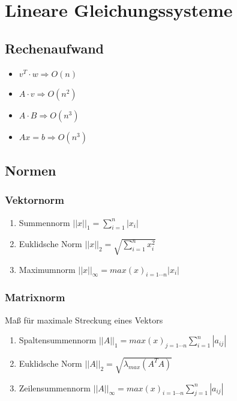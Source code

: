 \section{Lineare Gleichungssysteme}

\subsection{Rechenaufwand}
\begin{itemize}
	\item $v^T \cdot w \Rightarrow O(n)$
	\item $A \cdot v \Rightarrow O(n^2)$
	\item $A \cdot B \Rightarrow O(n^3)$
	\item $Ax = b \Rightarrow O(n^3)$
\end{itemize}

\subsection{Normen}

\subsubsection*{Vektornorm}
\begin{enumerate}

	\item Summennorm $||x||_1 = \sum_{i=1}^n|x_i|$
	
	\item Euklidsche Norm $||x||_2 = \sqrt{\sum_{i=1}^nx_i^2}$
	
	\item Maximumnorm $||x||_\infty = max(x)_{i=1\cdots n} |x_i|$

\end{enumerate}

\subsubsection*{Matrixnorm}
Maß für maximale Streckung eines Vektors
\begin{enumerate}

	\item Spaltensummennorm $||A||_1 = max(x)_{j=1\cdots n}\sum_{i=1}^n|a_{ij}|$
	
	\item Euklidsche Norm $||A||_2 = \sqrt{\lambda_{max}(A^TA)}$
	
	\item Zeilensummennorm $||A||_\infty = max(x)_{i=1\cdots n}\sum_{j=1}^n|a_{ij}|$

\end{enumerate}

